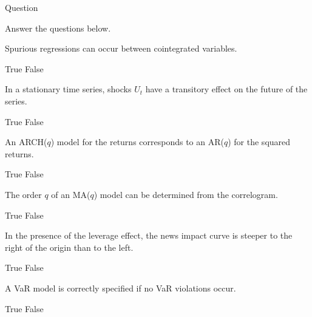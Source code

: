 \documentclass[12pt, a4paper]{article}
\begin{document}
\newpage
{}
\begin{exam}{Question \thequestion}
\begin{instructions}
Answer the questions below.
\end{instructions}

\begin{problem*}[\auto]
\begin{parts}
\item{}
Spurious regressions can occur between cointegrated variables.
\bigskip
\begin{answers}{3} %
    \bChoices
         True  
         False 
    \eChoices
    \end{answers}
\item{}
In a stationary time series, shocks $U_t$ have a transitory effect on the future of the series.
\bigskip
\begin{answers}{3} %
    \bChoices
         True  
         False 
    \eChoices
    \end{answers}
\item{}
An ARCH($q$) model for the returns corresponds to an AR($q$) for the squared returns.
\bigskip
\begin{answers}{3} %
    \bChoices
         True  
         False 
    \eChoices
    \end{answers}

\item{}
The order $q$ of an MA($q$) model can be determined from the correlogram.
\bigskip
\begin{answers}{3} %
    \bChoices
         True  
         False 
    \eChoices
    \end{answers}

\item{}
In the presence of the leverage effect, the news impact curve is steeper to the right of the origin than to the left.
\bigskip
\begin{answers}{3} %
    \bChoices
         True  
         False 
    \eChoices
    \end{answers}
\item{}
A VaR model is correctly specified if no VaR violations occur.
\bigskip
\begin{answers}{3} %
    \bChoices
         True  \eAns
         False 
    \eChoices
    \end{answers}

\end{parts}
\end{problem*}
\end{exam}
\end{document}
